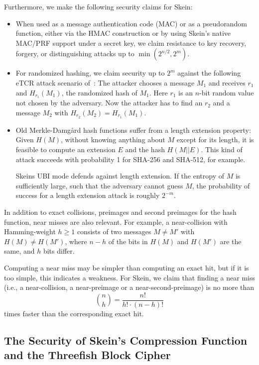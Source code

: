 \documentclass[11pt,twoside]{article}
\begin{document}
Furthermore, we make the following security claims for Skein:

\begin{itemize}
\item
When used as a message authentication code (MAC) or as a pseudorandom function, either via the HMAC construction or by using Skein's native MAC/PRF support under a secret key, we claim resistance to key recovery, forgery, or distinguishing attacks up to $\min(2^{n/2},2^m)$.

\item
For randomized hashing, we claim security up to $2^m$ against the following eTCR attack scenario of~\cite{HK06}: The attacker chooses a message $M_1$ and receives $r_1$ and $H_{r_1}(M_1)$, the randomized hash of $M_1$. Here $r_1$ is an $n$-bit random value not chosen by the adversary. Now the attacker has to find
an $r_2$ and a  message $M_2$ with
$H_{r_2}(M_2)=H_{r_1}(M_1)$.

\item
Old Merkle-Damg{\aa}rd hash functions suffer from a length extension property: Given $H(M)$, without knowing anything about $M$ except for its length, it is feasible to compute an extension $E$ and the hash $H(M||E)$. This kind of attack succeeds with probability 1 for SHA-256 and SHA-512, for example.

Skeins UBI mode defends against length extension. If the entropy of $M$ is sufficiently large, such that the adversary cannot guess $M$, the probability of success for a length extension attack is roughly $2^{-m}$.
\end{itemize}

In addition to exact collisions, preimages and second preimages for the hash function, near misses are also relevant. For example, a near-collision with Hamming-weight $h\ge 1$ consists of two messages $M \neq M'$ with $H(M) \neq H(M')$, where $n-h$ of the bits in $H(M)$ and $H(M')$ are the same, and $h$ bits differ.

Computing a near miss may be simpler than computing an exact hit, but if it is too simple, this indicates a weakness. For Skein, we claim that finding a near miss (i.e., a near-collision, a near-preimage or a near-second-preimage) is no more than
\[
\binom{n}{h} =  \frac{n!}{h! \cdot (n-h)!}
\]
times faster than the corresponding exact hit.

\subsection{The Security of Skein's Compression Function and the Threefish Block Cipher}
\end{document}
